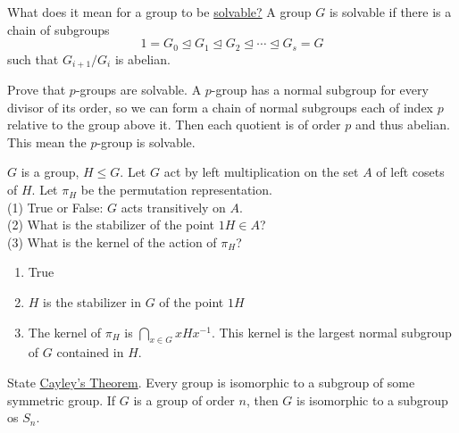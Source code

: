 \documentclass[avery5371,grid]{flashcards}
\newcommand{\inv}{^{-1}}
\begin{document}
\begin{flashcard}[Groups]{What does it mean for a group to be \underline{solvable?}}
 A group $G$ is solvable if there is a chain of subgroups
 $$
 1 = G_0 \trianglelefteq G_1 \trianglelefteq G_2 \trianglelefteq \cdots \trianglelefteq G_s = G
 $$
 such that $G_{i+1}/G_i$ is abelian.
\end{flashcard}

\begin{flashcard}[Groups]{Prove that $p$-groups are solvable.}
 A $p$-group has a normal subgroup for every divisor of its order, so we can form a chain of normal subgroups each of index $p$ relative to the group above it. Then each quotient is of order $p$ and thus abelian. This mean the $p$-group is solvable.
\end{flashcard}

\begin{flashcard}[Groups]{$G$ is a group, $H \leq G$. Let $G$ act by left multiplication on the set $A$ of left cosets of $H$. Let $\pi_H$ be the permutation representation.\\
\vspace*{1pt}
(1) True or False: $G$ acts transitively on $A$.\\
(2) What is the stabilizer of the point $1H \in A$?\\
(3) What is the kernel of the action of $\pi_H$?}
 \begin{enumerate}
      \item True
      \item $H$ is the stabilizer in $G$ of the point $1H$
      \item The kernel of $\pi_H$ is $\displaystyle \bigcap_{x \in G} x H x \inv$. This kernel is the largest normal subgroup of $G$ contained in $H$.
 \end{enumerate}
\end{flashcard}

\begin{flashcard}[Groups]{State \underline{Cayley's Theorem}.}
 Every group is isomorphic to a subgroup of some symmetric group. If $G$ is a group of order $n$, then $G$ is isomorphic to a subgroup os $S_n$.
\end{flashcard}
\end{document}
